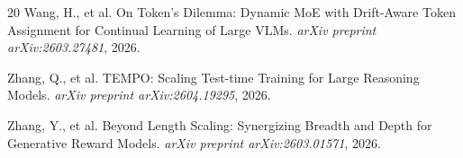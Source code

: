 \documentclass[11pt]{article}
\begin{document}
\begin{thebibliography}{20}
Wang, H., et al.
\newblock On Token's Dilemma: Dynamic MoE with Drift-Aware Token Assignment for Continual Learning of Large VLMs.
\newblock \emph{arXiv preprint arXiv:2603.27481}, 2026.

Zhang, Q., et al.
\newblock TEMPO: Scaling Test-time Training for Large Reasoning Models.
\newblock \emph{arXiv preprint arXiv:2604.19295}, 2026.

Zhang, Y., et al.
\newblock Beyond Length Scaling: Synergizing Breadth and Depth for Generative Reward Models.
\newblock \emph{arXiv preprint arXiv:2603.01571}, 2026.

\end{thebibliography}
\end{document}
